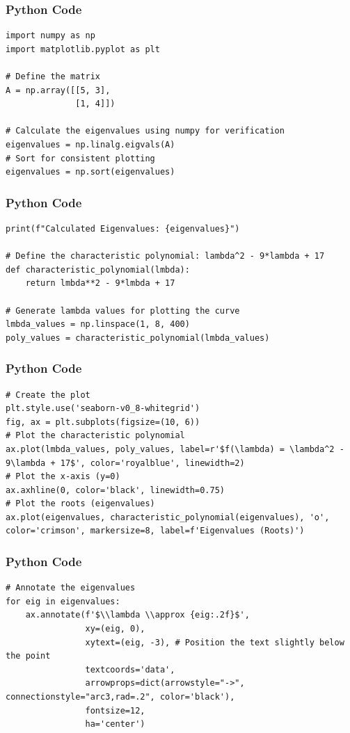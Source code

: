 \documentclass{beamer}
\begin{document}
\begin{frame}[fragile]
\frametitle{Python Code}
\begin{lstlisting}
import numpy as np
import matplotlib.pyplot as plt

# Define the matrix
A = np.array([[5, 3], 
              [1, 4]])

# Calculate the eigenvalues using numpy for verification
eigenvalues = np.linalg.eigvals(A)
# Sort for consistent plotting
eigenvalues = np.sort(eigenvalues) 
\end{lstlisting}
\end{frame}

\begin{frame}[fragile]
\frametitle{Python Code}
\begin{lstlisting}
print(f"Calculated Eigenvalues: {eigenvalues}")

# Define the characteristic polynomial: lambda^2 - 9*lambda + 17
def characteristic_polynomial(lmbda):
    return lmbda**2 - 9*lmbda + 17

# Generate lambda values for plotting the curve
lmbda_values = np.linspace(1, 8, 400)
poly_values = characteristic_polynomial(lmbda_values)
\end{lstlisting}
\end{frame}

\begin{frame}[fragile]
\frametitle{Python Code}
\begin{lstlisting}
# Create the plot
plt.style.use('seaborn-v0_8-whitegrid')
fig, ax = plt.subplots(figsize=(10, 6))
# Plot the characteristic polynomial
ax.plot(lmbda_values, poly_values, label=r'$f(\lambda) = \lambda^2 - 9\lambda + 17$', color='royalblue', linewidth=2)
# Plot the x-axis (y=0)
ax.axhline(0, color='black', linewidth=0.75)
# Plot the roots (eigenvalues)
ax.plot(eigenvalues, characteristic_polynomial(eigenvalues), 'o', color='crimson', markersize=8, label=f'Eigenvalues (Roots)')
\end{lstlisting}
\end{frame}

\begin{frame}[fragile]
\frametitle{Python Code}
\begin{lstlisting}
# Annotate the eigenvalues
for eig in eigenvalues:
    ax.annotate(f'$\\lambda \\approx {eig:.2f}$',
                xy=(eig, 0),
                xytext=(eig, -3), # Position the text slightly below the point
                textcoords='data',
                arrowprops=dict(arrowstyle="->", connectionstyle="arc3,rad=.2", color='black'),
                fontsize=12,
                ha='center')
\end{lstlisting}
\end{frame}
\end{document}
